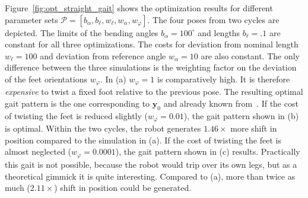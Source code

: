 \documentclass[10pt,a4paper]{article}
\begin{document}

Figure~\ref{fig:opt_straight_gait} shows the optimization results for different parameter sets $\mathcal{P} = [b_\alpha, b_\ell, w_\ell, w_\alpha, w_\varphi]$.
The four poses from two cycles are depicted.
The limits of the bending angles $b_{\alpha} = 100^\circ$ and lengths $b_{\ell}=.1$ are constant for all three optimizations.
The costs for deviation from nominal length $w_\ell = 100$ and deviation from reference angle $w_\alpha=10$ are also constant.
The only difference between the three simulations is the weighting factor on the deviation of the feet orientations $w_\varphi$.
In (a) $w_\varphi=1$ is comparatively high. 
It is therefore \textsl{expensive} to twist a fixed foot relative to the previous pose.
The resulting optimal gait pattern is the one corresponding to $\bm{y}_0$ and already known from~\cite{PA_Schiller}.
If the cost of twisting the feet is reduced slightly ($w_\varphi=0.01$), the gait pattern shown in (b) is optimal.
Within the two cycles, the robot generates $1.46 \times$ more shift in position compared to the simulation in (a).
If the cost of twisting the feet is almost neglected ($w_\varphi=0.0001$), the gait pattern shown in (c) results.
Practically this gait is not possible, because the robot would trip over its own legs, but as a theoretical gimmick it is quite interesting.
Compared to (a), more than twice as much ($2.11 \times$) shift in position could be generated.
\end{document}
